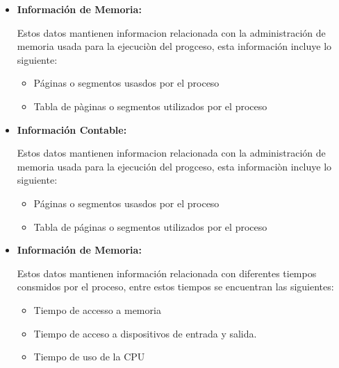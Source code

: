 \documentclass[12pt, fleqn]{report}                             %
\begin{document}
\begin{itemize}
                \item
                    \textbf{Información de Memoria:}

                        Estos datos mantienen informacion relacionada con la administración de memoria
                        usada para la ejecuciòn del progceso, esta información incluye lo siguiente:

                        \begin{itemize}
                            \item Páginas o segmentos usasdos por el proceso
                            \item Tabla de pàginas o segmentos utilizados por el proceso 
                        \end{itemize}
                
                \item
                    \textbf{Información Contable:}

                        Estos datos mantienen informacion relacionada con la administración de memoria
                        usada para la ejecución del progceso, esta informaciòn incluye lo siguiente: 
                            \begin{itemize}
                                \item Páginas o segmentos usasdos por el proceso
                                \item Tabla de páginas o segmentos utilizados por el proceso 
                            \end{itemize}
                
                \item
                    \textbf{Información de Memoria:}
                    
                        Estos datos mantienen información relacionada con diferentes tiempos consmidos por
                        el proceso, entre estos tiempos se encuentran las siguientes: 
                        \begin{itemize}
                            \item Tiempo de accesso a memoria 
                            \item Tiempo de acceso a dispositivos de entrada y salida.
                            \item Tiempo de uso de la CPU
                        \end{itemize}

                \end{itemize}
\end{document}
